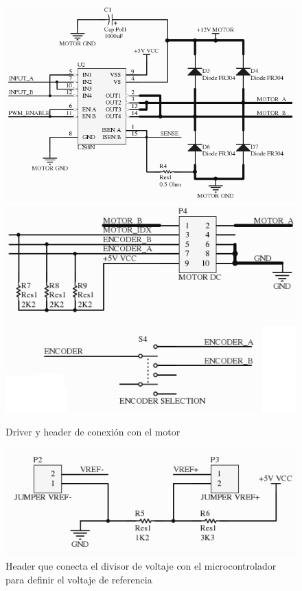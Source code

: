 \documentclass[a4paper,10pt]{article}
\begin{document}
\begin{figure}
\centering
\includegraphics[scale=.3]{schemaDriver.png}
\includegraphics[scale=.3]{schemaMotorEncoder.png}
\caption{Driver y header de conexi\'on con el motor}
\label{schema3}
\end{figure}

\begin{figure}
\centering
\includegraphics[scale=.3]{schemaADC.png}
\caption{Header que conecta el divisor de voltaje con el microcontrolador para definir el voltaje de referencia}
\label{schema4}
\end{figure}
\end{document}
